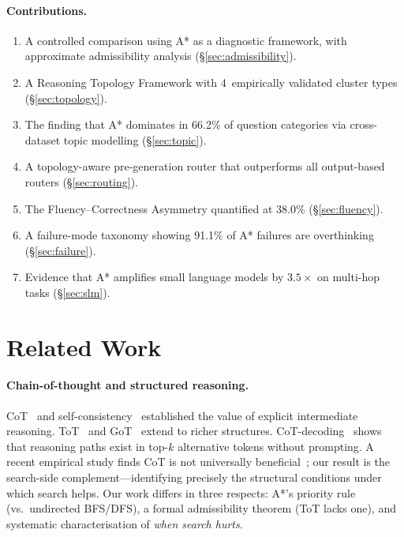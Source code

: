 \documentclass[11pt]{article}
\begin{document}
\paragraph{Contributions.}
\begin{enumerate}[leftmargin=1.5em,itemsep=2pt]
\item A controlled comparison using A* as a diagnostic framework, with
approximate admissibility analysis (\S\ref{sec:admissibility}).
\item A Reasoning Topology Framework with 4~empirically validated cluster
types (\S\ref{sec:topology}).
\item The finding that A* dominates in 66.2\% of question categories via
cross-dataset topic modelling (\S\ref{sec:topic}).
\item A topology-aware pre-generation router that outperforms all
output-based routers (\S\ref{sec:routing}).
\item The Fluency--Correctness Asymmetry quantified at 38.0\%
(\S\ref{sec:fluency}).
\item A failure-mode taxonomy showing 91.1\% of A* failures are
overthinking (\S\ref{sec:failure}).
\item Evidence that A* amplifies small language models by $3.5\times$ on
multi-hop tasks (\S\ref{sec:slm}).
\end{enumerate}

\section{Related Work}
\label{sec:related}

\paragraph{Chain-of-thought and structured reasoning.}
CoT~\citep{wei2022chain} and self-consistency~\citep{wang2023self} established
the value of explicit intermediate reasoning.  ToT~\citep{yao2024tree} and
GoT~\citep{besta2024graph} extend to richer structures.
CoT-decoding~\citep{wang2024chain} shows that reasoning paths exist in
top-$k$ alternative tokens without prompting.  A recent empirical study finds
CoT is not universally beneficial~\citep{meincke2025decreasing}; our result
is the search-side complement---identifying precisely the structural conditions
under which search helps.  Our work differs in three respects: A*'s priority
rule (vs.\ undirected BFS/DFS), a formal admissibility theorem (ToT lacks
one), and systematic characterisation of \emph{when search hurts}.
\end{document}
